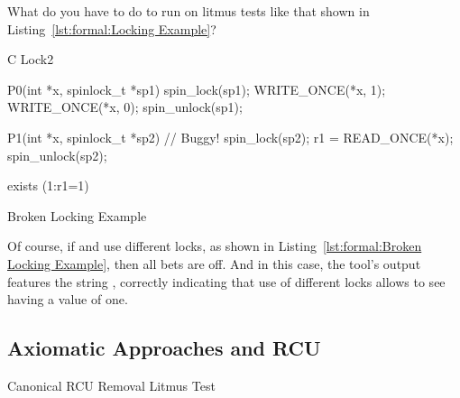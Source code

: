 \QuickQuiz{}
	What do you have to do to run  on litmus tests like
	that shown in Listing~\ref{lst:formal:Locking Example}?
 \QuickQuizEnd

\begin{listing}[tb]
\begin{linelabel}
\begin{VerbatimL}[commandchars=\\\[\]]
C Lock2

{
}

P0(int *x, spinlock_t *sp1)
{
	spin_lock(sp1);
	WRITE_ONCE(*x, 1);
	WRITE_ONCE(*x, 0);
	spin_unlock(sp1);
}

P1(int *x, spinlock_t *sp2) // Buggy!
{
	spin_lock(sp2);
	r1 = READ_ONCE(*x);
	spin_unlock(sp2);
}

exists (1:r1=1)
\end{VerbatimL}
\end{linelabel}
\caption{Broken Locking Example}
\label{lst:formal:Broken Locking Example}
\end{listing}

Of course, if  and  use different locks, as shown in
Listing~\ref{lst:formal:Broken Locking Example},
then all bets are off.
And in this case, the  tool's output features the string
, correctly indicating that use of different locks allows
 to see  having a value of one.

\subsection{Axiomatic Approaches and RCU}
\label{sec:formal:Axiomatic Approaches and RCU}

\begin{listing}[tb]

\caption{Canonical RCU Removal Litmus Test}
\label{lst:formal:Canonical RCU Removal Litmus Test}
\end{listing}

